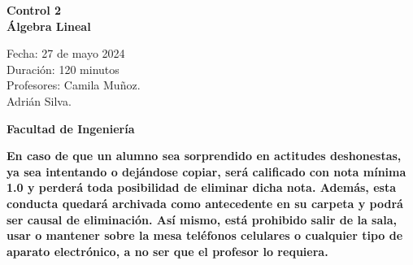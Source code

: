 \documentclass[a4paper]{article}
\theoremstyle{exampstyle}
\theoremstyle{definition}
\begin{document}
\thispagestyle{fancy}
\vspace*{1cm}

\begin{minipage}[r]{12cm}
    \begin{flushright}
    \end{flushright}
\end{minipage}

\begin{center}
\Large{\textbf{Control 2\\ Álgebra Lineal\\ }}
\end{center}
\vspace{1cm}
\begin{minipage}[r]{15cm}
\begin{flushleft}

Fecha: 27 de mayo 2024 \\%
Duración: 120 minutos  \\
Profesores: Camila Muñoz.\\\hspace{1.7cm} Adrián Silva.\\
\end{flushleft}
\end{minipage}
\vspace{2cm}
\begin{center}
\Large{\textbf{Facultad de Ingeniería}}
\end{center}
\vspace{1cm}
\textbf{En caso de que un alumno sea sorprendido en actitudes deshonestas, ya sea intentando o
dejándose copiar, será calificado con nota mínima 1.0 y perderá toda posibilidad de eliminar
dicha nota. Además, esta conducta quedará archivada como antecedente en su carpeta y
podrá ser causal de eliminación.
Así mismo, está prohibido salir de la sala, usar o mantener sobre la mesa teléfonos celulares
o cualquier tipo de aparato electrónico, a no ser que el profesor lo requiera.}\\



\vspace{5cm}
\newpage
\thispagestyle{empty}
\end{document}
